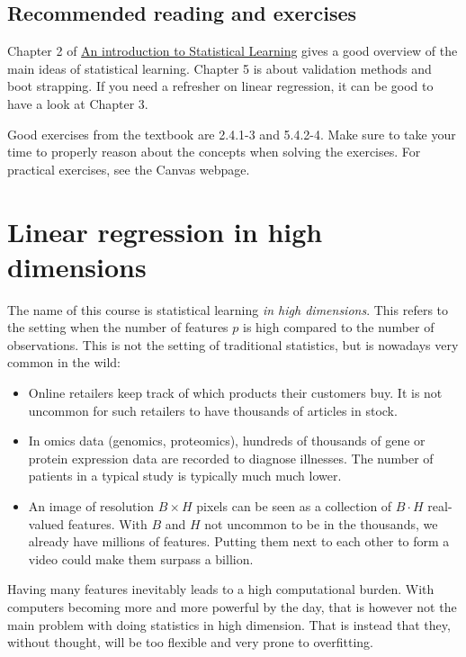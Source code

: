 \documentclass{article}
\begin{document}
\subsection{Recommended reading and exercises}
Chapter 2 of \href{https://www.statlearning.com/}{An introduction to Statistical Learning} gives a good overview of the main ideas of statistical learning. Chapter 5 is about validation methods and boot strapping. If you need a refresher on linear regression, it can be good to have a look at Chapter 3.

Good exercises from the textbook are 2.4.1-3 and 5.4.2-4. Make sure to take your time to properly reason about the concepts when solving the exercises. For practical exercises, see the Canvas webpage.

\section{Linear regression in high dimensions}

The name of this course is statistical learning \emph{in high dimensions}. This refers to the setting when the number of features $p$ is high compared to the number of observations. This is not the setting of traditional statistics, but is nowadays very common in the wild:
\begin{itemize}
    \item Online retailers keep track of which products their customers buy. It is not uncommon for such retailers to have thousands of articles in stock. 
    \item In omics data (genomics, proteomics), hundreds of thousands of gene or protein expression data are recorded to diagnose illnesses. The number of patients in a typical study is typically much much lower.
    \item An image of resolution $B\times H$ pixels can be seen as a collection of $B\cdot H$ real-valued features. With $B$ and $H$ not uncommon to be in the thousands, we already have millions of features. Putting them next to each other to form a video could make them surpass a billion.
\end{itemize}
Having many features inevitably leads to a high computational burden. With computers becoming more and more powerful by the day, that is however not the main problem with doing statistics in high dimension. That is instead that they, without thought, will be too flexible and very prone to overfitting.
\end{document}
